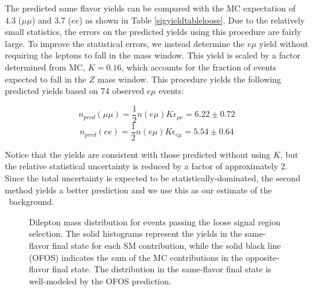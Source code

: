 The predicted same flavor \ttbar yields 
can be compared 
with the MC expectation of 
4.3 %
($\mu\mu$) and 
3.7 %
($ee$) as shown in Table \ref{sigyieldtableloose}.
Due to the relatively small statistics, the errors on the predicted yields 
using this procedure are fairly large.
To improve the statistical errors, we instead determine the $e\mu$ yield
without requiring the leptons to fall in the \Z mass window. 
This yield is scaled by a factor determined from MC, $K= 0.16$, %
which accounts for the fraction of \ttbar events expected to fall in the $Z$ mass
window. This procedure yields the following
predicted yields based on 74 observed $e\mu$ events: %

\begin{equation}
n_{pred}(\mu\mu) = \frac{1}{2}n(e\mu)K\epsilon_{\mu e} = 6.22 \pm 0.72
\end{equation}
\begin{equation}
n_{pred}(ee)     = \frac{1}{2}n(e\mu)K\epsilon_{e\mu} = 5.54 \pm 0.64
\end{equation}

Notice that the yields are consistent with those predicted without using $K$, but the relative statistical uncertainty is reduced by a factor of approximately 2.
Since the total uncertainty is expected to be statistically-dominated, the second method yields a better prediction and we use this as our estimate
of the \ttbar~background. 


\begin{figure}[hbt]
  \begin{center}
    \caption{Dilepton mass distribution for events passing the loose signal region selection. The solid histograms represent the yields in the same-flavor
      final state for each SM contribution, while the solid black line (OFOS) indicates the sum of the MC contributions in the opposite-flavor final state.
      The \ttbar distribution in the same-flavor final state is well-modeled by the OFOS prediction.}
    \label{fig:ttbar}
  \end{center}
\end{figure}

